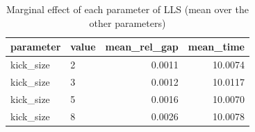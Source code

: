 \begin{table}[htbp]
\centering
\small
\caption{Marginal effect of each parameter of LLS (mean over the other parameters)}
\label{tab:E8b_tuning_budget_LLS_marginal}
\begin{tabular}{llrr}
\toprule
parameter & value & mean\_rel\_gap & mean\_time \\
\midrule
kick\_size & 2 & 0.0011 & 10.0074 \\
kick\_size & 3 & 0.0012 & 10.0117 \\
kick\_size & 5 & 0.0016 & 10.0070 \\
kick\_size & 8 & 0.0026 & 10.0078 \\
\bottomrule
\end{tabular}
\end{table}
